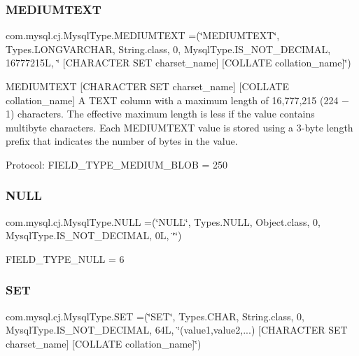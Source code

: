 \subsubsection{\texorpdfstring{M\+E\+D\+I\+U\+M\+T\+E\+XT}{MEDIUMTEXT}}
{\footnotesize\ttfamily com.\+mysql.\+cj.\+Mysql\+Type.\+M\+E\+D\+I\+U\+M\+T\+E\+XT =(\char`\"{}M\+E\+D\+I\+U\+M\+T\+E\+XT\char`\"{}, Types.\+L\+O\+N\+G\+V\+A\+R\+C\+H\+AR, String.\+class, 0, Mysql\+Type.\+I\+S\+\_\+\+N\+O\+T\+\_\+\+D\+E\+C\+I\+M\+AL, 16777215\+L, \char`\"{} \mbox{[}\+C\+H\+A\+R\+A\+C\+T\+E\+R S\+E\+T charset\+\_\+name\mbox{]} \mbox{[}\+C\+O\+L\+L\+A\+T\+E collation\+\_\+name\mbox{]}\char`\"{})}

M\+E\+D\+I\+U\+M\+T\+E\+XT \mbox{[}C\+H\+A\+R\+A\+C\+T\+ER S\+ET charset\+\_\+name\mbox{]} \mbox{[}C\+O\+L\+L\+A\+TE collation\+\_\+name\mbox{]} A T\+E\+XT column with a maximum length of 16,777,215 (224 − 1) characters. The effective maximum length is less if the value contains multibyte characters. Each M\+E\+D\+I\+U\+M\+T\+E\+XT value is stored using a 3-\/byte length prefix that indicates the number of bytes in the value.

Protocol\+: F\+I\+E\+L\+D\+\_\+\+T\+Y\+P\+E\+\_\+\+M\+E\+D\+I\+U\+M\+\_\+\+B\+L\+OB = 250 \mbox{\label{enumcom_1_1mysql_1_1cj_1_1_mysql_type_afd999a269aedd95acf6ae2453b95e2a3}} 
\subsubsection{\texorpdfstring{N\+U\+LL}{NULL}}
{\footnotesize\ttfamily com.\+mysql.\+cj.\+Mysql\+Type.\+N\+U\+LL =(\char`\"{}N\+U\+LL\char`\"{}, Types.\+N\+U\+LL, Object.\+class, 0, Mysql\+Type.\+I\+S\+\_\+\+N\+O\+T\+\_\+\+D\+E\+C\+I\+M\+AL, 0\+L, \char`\"{}\char`\"{})}

F\+I\+E\+L\+D\+\_\+\+T\+Y\+P\+E\+\_\+\+N\+U\+LL = 6 \mbox{\label{enumcom_1_1mysql_1_1cj_1_1_mysql_type_acf82f4d6ab19d38105ae67f3d1561c8e}} 
\subsubsection{\texorpdfstring{S\+ET}{SET}}
{\footnotesize\ttfamily com.\+mysql.\+cj.\+Mysql\+Type.\+S\+ET =(\char`\"{}S\+ET\char`\"{}, Types.\+C\+H\+AR, String.\+class, 0, Mysql\+Type.\+I\+S\+\_\+\+N\+O\+T\+\_\+\+D\+E\+C\+I\+M\+AL, 64\+L, \char`\"{}(\textquotesingle{}value1\textquotesingle{},\textquotesingle{}value2\textquotesingle{},...) \mbox{[}\+C\+H\+A\+R\+A\+C\+T\+E\+R S\+E\+T charset\+\_\+name\mbox{]} \mbox{[}\+C\+O\+L\+L\+A\+T\+E collation\+\_\+name\mbox{]}\char`\"{})}


